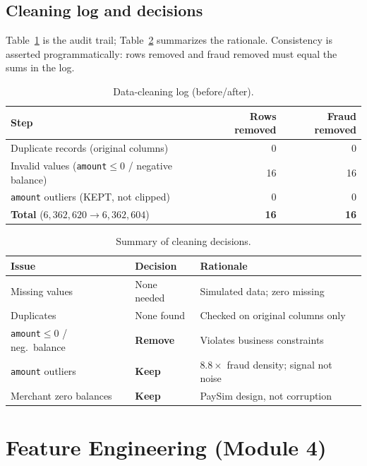 \documentclass{article}
\begin{document}
\subsection{Cleaning log and decisions}
Table~\ref{tab:cleanlog} is the audit trail; Table~\ref{tab:decisions}
summarizes the rationale. Consistency is asserted programmatically:
rows removed and fraud removed must equal the sums in the log.

\begin{table}[H]
\centering
\caption{Data-cleaning log (before/after).}
\label{tab:cleanlog}
\begin{tabular}{lrr}
\toprule
Step & Rows removed & Fraud removed \\
\midrule
Duplicate records (original columns)                & 0  & 0 \\
Invalid values (\texttt{amount}$\le$0 / negative balance) & 16 & 16 \\
\texttt{amount} outliers (KEPT, not clipped)        & 0  & 0 \\
\midrule
\textbf{Total} ($6{,}362{,}620 \to 6{,}362{,}604$)  & \textbf{16} & \textbf{16} \\
\bottomrule
\end{tabular}
\end{table}

\begin{table}[H]
\centering
\caption{Summary of cleaning decisions.}
\label{tab:decisions}
\small
\begin{tabular}{lll}
\toprule
Issue & Decision & Rationale \\
\midrule
Missing values          & None needed  & Simulated data; zero missing \\
Duplicates              & None found   & Checked on original columns only \\
\texttt{amount}$\le$0 / neg.\ balance & \textbf{Remove} & Violates business constraints \\
\texttt{amount} outliers & \textbf{Keep} & $8.8\times$ fraud density; signal not noise \\
Merchant zero balances   & \textbf{Keep} & PaySim design, not corruption \\
\bottomrule
\end{tabular}
\end{table}

\section{Feature Engineering (Module 4)}
\label{sec:feat}
\end{document}
